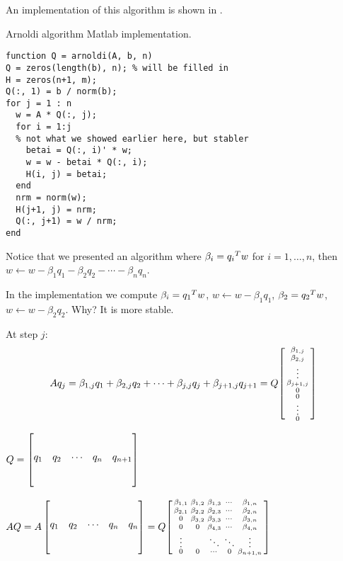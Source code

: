\documentclass[ComputationalMathematics.tex]{subfiles}
\begin{document}
An implementation of this algorithm is shown in .
\begin{center}
\begin{minipage}{.9\linewidth}
  \begin{algorithm}[H]
    \caption{Arnoldi algorithm Matlab implementation.}\label{alg:29novarnoldi}
    \begin{verbatim}
function Q = arnoldi(A, b, n)
Q = zeros(length(b), n); % will be filled in
H = zeros(n+1, m);
Q(:, 1) = b / norm(b);
for j = 1 : n
  w = A * Q(:, j);
  for i = 1:j
  % not what we showed earlier here, but stabler
    betai = Q(:, i)' * w;
    w = w - betai * Q(:, i);
    H(i, j) = betai;
  end
  nrm = norm(w);
  H(j+1, j) = nrm;
  Q(:, j+1) = w / nrm;
end
    \end{verbatim}
  \end{algorithm}
\end{minipage}
\end{center}
\vspace{0.5cm}

Notice that we presented an algorithm where $\beta_i = {q_i}^{T} w$ for $i=1, \ldots, n$, then $w \gets w - \beta_1 q_1 - \beta_2 q_2 - \cdots - \beta_n q_n$.

In the implementation we compute $\beta_i = {q_1}^{T} w$, $w \gets w - \beta_1 q_1$, $\beta_2 = {q_2}^{T} w$, $w \gets w - \beta_2 q_2$. Why? It is more stable.

At step $j$: \[
A q_j = \beta_{1,j}q_1 + \beta_{2,j}q_2 + \cdots + \beta_{j,j}q_j + \beta_{j+1,j}q_{j+1} = Q \begin{bsmallmatrix}
    \beta_{1,j}\\
    \beta_{2,j}\\
    \vdots\\
    \beta_{j+1,j}\\
    0\\
    0\\
    \vdots\\
    0
\end{bsmallmatrix}
\vspace{-0.5cm}
\]

$Q = \begin{bmatrix}
  \rule[-10mm]{0pt}{20mm} q_1 & q_2 & \cdots & q_n & q_{n+1}
\end{bmatrix}$

$AQ = A \begin{bmatrix}
    \rule[-10mm]{0pt}{20mm} q_1 & q_2 & \cdots & q_n & q_{n}
\end{bmatrix} = Q \begin{bsmallmatrix}
  \beta_{1, 1} & \beta_{1, 2} & \beta_{1, 3} & \cdots & \beta_{1,n}\\
  \beta_{2, 1} & \beta_{2, 2} & \beta_{2, 3} & \cdots & \beta_{2,n}\\
    0 & \beta_{3,2} & \beta_{3,3} & \cdots & \beta_{3,n}\\
    0 & 0 & \beta_{4,3} & \cdots & \beta_{4,n}\\
    \vdots & & \ddots & \ddots & \vdots\\
    0 & 0 & \cdots & 0 & \beta_{n+1, n}
\end{bsmallmatrix}$ 
\end{document}
